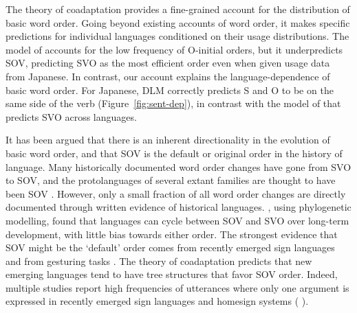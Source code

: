 \documentclass[11pt,a4paper]{article}
\begin{document}
The theory of coadaptation provides a fine-grained account for the distribution of basic word order.
Going beyond existing accounts of word order, it makes specific predictions for individual languages conditioned on their usage distributions.
The model of \cite{maurits2010why} accounts for the low frequency of O-initial orders, but it underpredicts SOV, predicting SVO as the most efficient order even when given usage data from Japanese.
In contrast, our account explains the language-dependence of basic word order.
For Japanese, DLM correctly predicts S and O to be on the same side of the verb (Figure~\ref{fig:sent-dep}), in contrast with the model of \cite{maurits2010why} that predicts SVO across languages. %

It has been argued that there is an inherent directionality in the evolution of basic word order, and that SOV is the default or original order in the history of language.
Many historically documented word order changes have gone from SVO to SOV, and the protolanguages of several extant families are thought to have been SOV \citep{givon1979understanding, newmeyer2000evolutionary, maurits2014tracing}.
However, only a small fraction of all word order changes are directly documented through written evidence of historical languages.
\citep{maurits2014tracing}, using phylogenetic modelling, found that languages can cycle between SOV and SVO over long-term development, with little bias towards either order.
The strongest evidence that SOV might be the `default' order comes from recently emerged sign languages \citep{senghas1997argument, sandler2005emergence, goldin-meadow1998spontaneous} and from gesturing tasks \citep{goldin-meadow2008natural, langus2010cognitive}.
The theory of coadaptation predicts that new emerging languages tend to have tree structures that favor SOV order.
Indeed, multiple studies report high frequencies of utterances where only one argument is expressed in recently emerged sign languages and homesign systems (\citet{sandler2005emergence} \citet{goldin-meadow1998spontaneous}\citep[p. 31]{neveu2016sign}\citep[p. 622]{ergin2018development}). %
\end{document}
